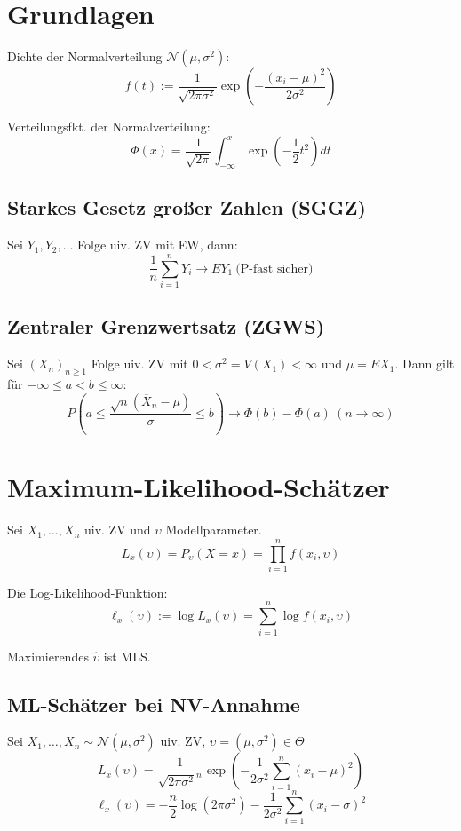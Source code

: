 \renewcommand{\N}{\mathcal{N}}

\section*{Grundlagen}

Dichte der Normalverteilung \(\N(\mu, \sigma^2)\):
\[ f(t) := \frac{1}{\sqrt{2\pi\sigma^2}} \exp\left( -\frac{(x_i-\mu)^2}{2\sigma^2} \right) \]

Verteilungsfkt. der Normalverteilung:
\[ \Phi(x) = \frac{1}{\sqrt{2\pi}} \int_{-\infty}^x \exp\left(-\frac{1}{2} t^2\right) dt \]

\subsection*{Starkes Gesetz großer Zahlen (SGGZ)}

Sei \(Y_1,Y_2,\dots\) Folge uiv. ZV mit EW, dann:
\[ \frac{1}{n} \sum_{i=1}^n Y_i \to EY_1 \ \text{(P-fast sicher)} \]

\subsection*{Zentraler Grenzwertsatz (ZGWS)}

Sei \((X_n)_{n\geq1}\) Folge uiv. ZV mit \(0 < \sigma^2 = V(X_1) < \infty\) und \(\mu = EX_1\). Dann gilt für \(-\infty \leq a < b \leq \infty\):
\[ P\left( a \leq \frac{\sqrt{n}(\overline X_n - \mu)}{\sigma} \leq b \right) \to \Phi(b) - \Phi(a) \ (n \to \infty) \]

\section*{Maximum-Likelihood-Schätzer}

Sei \(X_1, \dots, X_n\) uiv. ZV und \(\upsilon\) Modellparameter.
\[ L_x(\upsilon) = P_\upsilon(X=x) = \prod_{i=1}^n f(x_i, \upsilon) \]

Die Log-Likelihood-Funktion:
\[ \ell_x(\upsilon) := \log L_x(\upsilon) = \sum_{i=1}^n \log f(x_i, \upsilon) \]

Maximierendes \(\hat\upsilon\) ist MLS.

\subsection*{ML-Schätzer bei NV-Annahme}

Sei \(X_1, \dots, X_n \sim \N(\mu,\sigma^2)\) uiv. ZV, \(\upsilon = (\mu,\sigma^2) \in \Theta\)
\[ L_x(\upsilon) = \frac{1}{\sqrt{2\pi\sigma^2}^n} \exp\left( -\frac{1}{2\sigma^2} \sum_{i=1}^n (x_i-\mu)^2 \right) \]
\[ \ell_x(\upsilon) = -\frac{n}{2} \log(2\pi\sigma^2) - \frac{1}{2\sigma^2} \sum_{i=1}^n (x_i-\sigma)^2 \]

